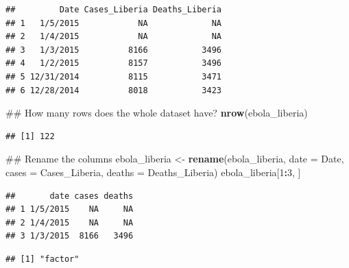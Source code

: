 \documentclass[]{book}
\makeatletter
\newenvironment{Shaded}{\begin{snugshade}}{\end{snugshade}}
\newcommand{\KeywordTok}[1]{\textcolor[rgb]{0.13,0.29,0.53}{\textbf{#1}}}
\newcommand{\DataTypeTok}[1]{\textcolor[rgb]{0.13,0.29,0.53}{#1}}
\newcommand{\DecValTok}[1]{\textcolor[rgb]{0.00,0.00,0.81}{#1}}
\newcommand{\StringTok}[1]{\textcolor[rgb]{0.31,0.60,0.02}{#1}}
\newcommand{\OperatorTok}[1]{\textcolor[rgb]{0.81,0.36,0.00}{\textbf{#1}}}
\newcommand{\NormalTok}[1]{#1}
\newenvironment{kframe}{%
\medskip{}
\setlength{\fboxsep}{.8em}
 \def\at@end@of@kframe{}%
 \ifinner\ifhmode%
  \def\at@end@of@kframe{\end{minipage}}%
  \begin{minipage}{\columnwidth}%
 \fi\fi%
 \def\FrameCommand##1{\hskip\@totalleftmargin \hskip-\fboxsep
 \colorbox{shadecolor}{##1}\hskip-\fboxsep
     \hskip-\linewidth \hskip-\@totalleftmargin \hskip\columnwidth}%
 \MakeFramed {\advance\hsize-\width
   \@totalleftmargin\z@ \linewidth\hsize
   \@setminipage}}%
 {\par\unskip\endMakeFramed%
 \at@end@of@kframe}
\renewenvironment{Shaded}{\begin{kframe}}{\end{kframe}}
\theoremstyle{definition}
\theoremstyle{definition}
\theoremstyle{definition}
\theoremstyle{remark}
\makeatother
\begin{document}
\begin{verbatim}
##         Date Cases_Liberia Deaths_Liberia
## 1   1/5/2015            NA             NA
## 2   1/4/2015            NA             NA
## 3   1/3/2015          8166           3496
## 4   1/2/2015          8157           3496
## 5 12/31/2014          8115           3471
## 6 12/28/2014          8018           3423
\end{verbatim}

\begin{Shaded}
\begin{Highlighting}[]
\NormalTok{## How many rows does the whole dataset have?}
\KeywordTok{nrow}\NormalTok{(ebola_liberia)}
\end{Highlighting}
\end{Shaded}

\begin{verbatim}
## [1] 122
\end{verbatim}

\begin{Shaded}
\begin{Highlighting}[]
\NormalTok{## Rename the columns}
\NormalTok{ebola_liberia <-}\StringTok{ }\KeywordTok{rename}\NormalTok{(ebola_liberia,}
                        \DataTypeTok{date =}\NormalTok{ Date,}
                        \DataTypeTok{cases =}\NormalTok{ Cases_Liberia,}
                        \DataTypeTok{deaths =}\NormalTok{ Deaths_Liberia)}
\NormalTok{ebola_liberia[}\DecValTok{1}\OperatorTok{:}\DecValTok{3}\NormalTok{, ]}
\end{Highlighting}
\end{Shaded}

\begin{verbatim}
##       date cases deaths
## 1 1/5/2015    NA     NA
## 2 1/4/2015    NA     NA
## 3 1/3/2015  8166   3496
\end{verbatim}

\begin{Shaded}
\end{Shaded}

\begin{verbatim}
## [1] "factor"
\end{verbatim}

\begin{Shaded}
\end{Shaded}
\end{document}
